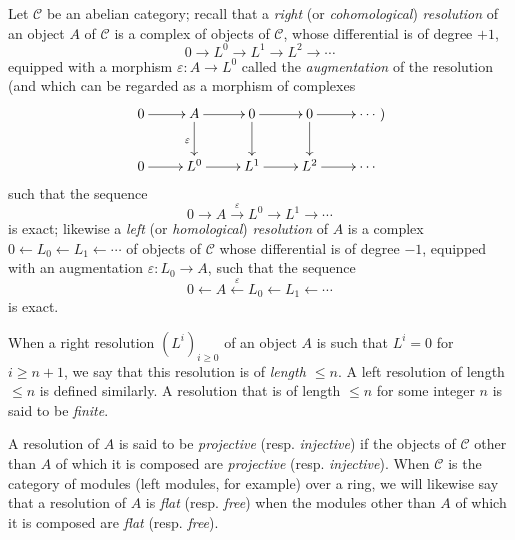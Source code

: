 \begin{env}[11.4.1]
\label{0.11.4.1}
Let $\mathcal C$ be an abelian category; recall that a
\emph{right} (or \emph{cohomological}) \emph{resolution} of an object $A$ of
$\mathcal C$ is a complex of objects of $\mathcal C$, whose
differential is of degree $+1$,
\[
  0\longrightarrow L^0\longrightarrow L^1\longrightarrow L^2
  \longrightarrow\cdots
\]
equipped with a morphism $\varepsilon:A\to L^0$ called the \emph{augmentation} of the
resolution (and which can be regarded as a morphism of complexes
\[
\xymatrix{
  0\ar[r] & A\ar[r]\ar[d]_{\varepsilon} & 0\ar[r]\ar[d]
    & 0\ar[r]\ar[d] & \cdots\\
  0\ar[r] & L^0\ar[r] & L^1\ar[r] & L^2\ar[r] & \cdots
})
\]
such that the sequence
\[
  0\longrightarrow A\xrightarrow{\varepsilon}L^0\longrightarrow L^1
  \longrightarrow\cdots
\]
is exact; likewise a \emph{left} (or \emph{homological}) \emph{resolution}
of $A$ is a complex
$0\leftarrow L_0\leftarrow L_1\leftarrow\cdots$ of objects of $\mathcal C$
whose differential is of degree $-1$, equipped with an augmentation
$\varepsilon:L_0\to A$, such that the sequence
\[
  0\longleftarrow A\xleftarrow{\varepsilon}L_0\longleftarrow L_1
  \longleftarrow\cdots
\]
is exact.

When a right resolution $(L^i)_{i\geq0}$ of an object $A$ is such that
$L^i=0$ for $i\geq n+1$, we say that this resolution is of
\emph{length $\leq n$}. A left resolution of length $\leq n$ is defined
similarly. A resolution that is of length $\leq n$ for some integer
$n$ is said to be \emph{finite}.

A resolution of $A$ is said to be \emph{projective} (resp. \emph{injective}) if
the objects of $\mathcal C$ other than $A$ of which it is composed are
\emph{projective} (resp. \emph{injective}). When $\mathcal C$ is the
category of modules (left modules, for example) over a ring, we will likewise say
that a resolution of $A$ is \emph{flat} (resp. \emph{free}) when the
modules other than $A$ of which it is composed are \emph{flat} (resp.
\emph{free}).
\end{env}

